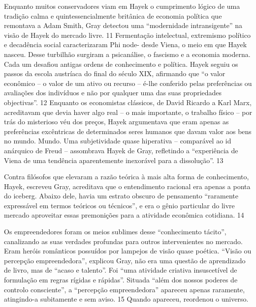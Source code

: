 \par
 
Enquanto muitos conservadores viam em Hayek o cumprimento lógico de uma tradição calma e quintessencialmente britânica de economia política que remontava a Adam Smith, Gray detectou uma “modernidade intransigente” na visão de Hayek do mercado livre.
 {\color{blue} 11}  
Fermentação intelectual, extremismo político e decadência social caracterizaram Phi node- desde Viena, o meio em que Hayek nasceu. Desse turbilhão surgiram a psicanálise, o fascismo e a economia moderna. Cada um desafiou antigas ordens de conhecimento e política. Hayek seguiu os passos da escola austríaca do final do século XIX, afirmando que “o valor econômico – o valor de um ativo ou recurso – é-lhe conferido pelas preferências ou avaliações dos indivíduos e não por qualquer uma das suas propriedades objectivas”.
 {\color{blue} 12}  
Enquanto os economistas clássicos, de David Ricardo a Karl Marx, acreditavam que devia haver algo real – o mais importante, o trabalho físico – por trás do misterioso véu dos preços, Hayek argumentava que eram apenas as preferências excêntricas de determinados seres humanos que davam valor aos bens no mundo. Mundo. Uma subjetividade quase hiperativa – comparável ao id anárquico de Freud – assombrava Hayek de Gray, refletindo a “experiência de Viena de uma tendência aparentemente inexorável para a dissolução”.
 {\color{blue} 13}  

 
\par
 
Contra filósofos que elevaram a razão teórica à mais alta forma de conhecimento, Hayek, escreveu Gray, acreditava que o entendimento racional era apenas a ponta do iceberg. Abaixo dele, havia um estrato obscuro de pensamento “raramente expressável em termos teóricos ou técnicos”, e era o gênio particular do livre mercado aproveitar essas premonições para a atividade econômica cotidiana.
 {\color{blue} 14}  

 
\par
 
Os empreendedores foram os meios sublimes desse “conhecimento tácito”, canalizando as suas verdades profundas para outros intervenientes no mercado. Eram heróis românticos possuídos por lampejos de visão quase poética. “Visão ou percepção empreendedora”, explicou Gray, não era uma questão de aprendizado de livro, mas de “acaso e talento”. Foi “uma atividade criativa insuscetível de formulação em regras rígidas e rápidas”. Situada “além dos nossos poderes de controlo consciente”, a “percepção empreendedora” apareceu apenas raramente, atingindo-a subitamente e sem aviso.
 {\color{blue} 15}  
Quando apareceu, reordenou o universo.
 
